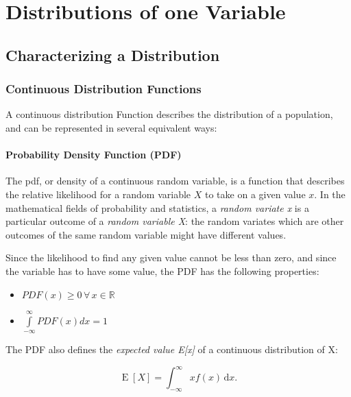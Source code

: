 \chapter{Distributions of one Variable}


\section{Characterizing a Distribution}

\subsection{Continuous Distribution Functions}

A continuous \gls{distribution} Function describes the distribution of a population, and can be represented in several equivalent ways:

\subsubsection{Probability Density Function (PDF)}
The \acrfull{pdf}, or \gls{density} of a continuous random variable, is a function that describes the relative likelihood for a random variable $X$ to take on a given value $x$.
In the mathematical fields of probability and statistics, a \emph{random variate x}  is a particular outcome of a \emph{random variable X}: the random variates which are other outcomes of the same random variable might have different values.

Since the likelihood to find any given value cannot be less than zero, and since the variable has to have some value, the PDF has the following properties:

\begin{itemize}
  \item $PDF(x) \geq 0\,\forall \,x \in \mathbb{R}$
  \item $ \int\limits_{ - \infty }^\infty  {PDF(x)dx = 1} $
\end{itemize}

The PDF also defines the \emph{expected value E[x]}  of a continuous distribution of X:

\begin{equation}\label{eq:expectedValue}
   \operatorname{E}[X] = \int_{-\infty}^\infty x f(x)\, \mathrm{d}x .
\end{equation}

